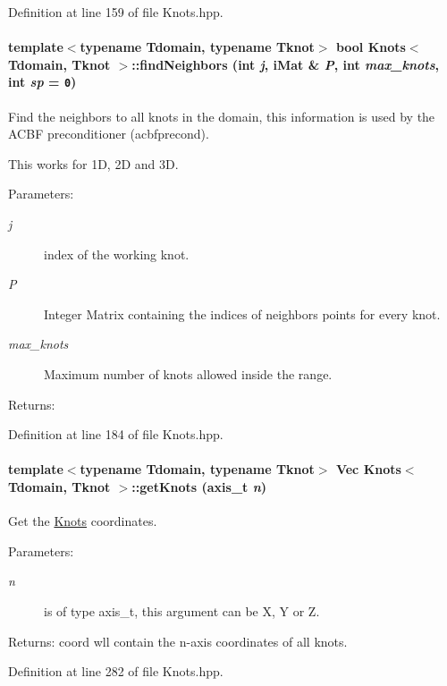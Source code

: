 Definition at line 159 of file Knots.hpp.\hypertarget{classKnots_2c5bd54aa20e1911a4aad58e71c111d7}{
\paragraph[{findNeighbors}]{\setlength{\rightskip}{0pt plus 5cm}template$<$typename Tdomain, typename Tknot$>$ bool {\bf Knots}$<$ Tdomain, Tknot $>$::findNeighbors (int {\em j}, \/  {\bf iMat} \& {\em P}, \/  int {\em max\_\-knots}, \/  int {\em sp} = {\tt 0})}\hfill}
\label{classKnots_2c5bd54aa20e1911a4aad58e71c111d7}


Find the neighbors to all knots in the domain, this information is used by the ACBF preconditioner (acbfprecond). 

This works for 1D, 2D and 3D. \begin{Desc}
\item[Parameters:]
\begin{description}
\item[{\em j}]index of the working knot. \item[{\em P}]Integer Matrix containing the indices of neighbors points for every knot. \item[{\em max\_\-knots}]Maximum number of knots allowed inside the range. \end{description}
\end{Desc}
\begin{Desc}
\item[Returns:]\end{Desc}


Definition at line 184 of file Knots.hpp.\hypertarget{classKnots_9254851feaf50e49998af12c091d026e}{
\paragraph[{getKnots}]{\setlength{\rightskip}{0pt plus 5cm}template$<$typename Tdomain, typename Tknot$>$ {\bf Vec} {\bf Knots}$<$ Tdomain, Tknot $>$::getKnots (axis\_\-t {\em n})}\hfill}
\label{classKnots_9254851feaf50e49998af12c091d026e}


Get the \hyperlink{classKnots}{Knots} coordinates. 

\begin{Desc}
\item[Parameters:]
\begin{description}
\item[{\em n}]is of type axis\_\-t, this argument can be X, Y or Z. \end{description}
\end{Desc}
\begin{Desc}
\item[Returns:]coord wll contain the n-axis coordinates of all knots. \end{Desc}


Definition at line 282 of file Knots.hpp.
